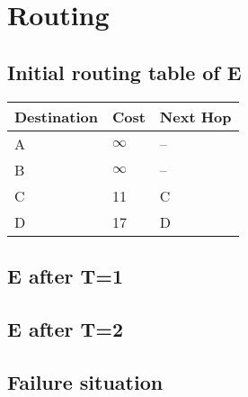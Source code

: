 \section{Routing}
\subsection{Initial routing table of E}
\begin{tabular}{| l | l | l |}
    \hline
    Destination & Cost & Next Hop \\ \hline
    A & $\infty$ & -- \\ \hline
    B & $\infty$ & -- \\ \hline
    C & 11 & C \\ \hline
    D & 17 & D \\ \hline
\end{tabular}
\subsection{E after T=1}
\subsection{E after T=2}
\subsection{Failure situation}
